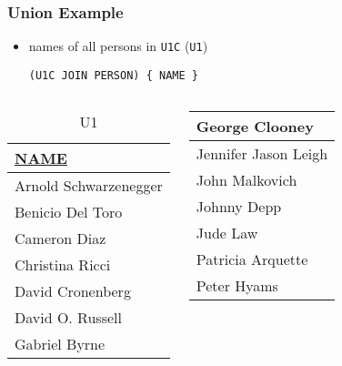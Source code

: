 \documentclass[dvipsnames]{beamer}
\theoremstyle{plain}
\begin{document}
\begin{frame}[fragile]
  \frametitle{Union Example}

  \begin{itemize}
    \item names of all persons in \texttt{U1C} (\texttt{U1})
    \begin{lstlisting}
(U1C JOIN PERSON) { NAME }
    \end{lstlisting}
  \end{itemize}

  \vspace{-10pt}
  \begin{columns}[b]
    \begin{tiny}
    \begin{table}
      \caption{U1}
      \begin{tabular}{|l|}\hline
\underline{NAME}     \\[2pt]\hline\hline
Arnold Schwarzenegger\\\hline
Benicio Del Toro     \\\hline
Cameron Diaz         \\\hline
Christina Ricci      \\\hline
David Cronenberg     \\\hline
David O. Russell     \\\hline
Gabriel Byrne        \\\hline
      \end{tabular}
    \end{table}
    \end{tiny}

    \begin{tiny}
    \begin{table}
      \begin{tabular}{|l|}\hline
George Clooney       \\\hline
Jennifer Jason Leigh \\\hline
John Malkovich       \\\hline
Johnny Depp          \\\hline
Jude Law             \\\hline
Patricia Arquette    \\\hline
Peter Hyams          \\\hline
      \end{tabular}
    \end{table}
    \end{tiny}


\end{columns}
\end{frame}
\end{document}
